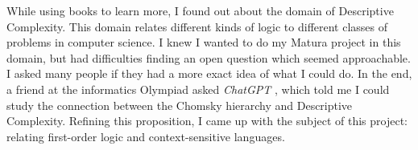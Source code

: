 While using books to learn more, I found out about the domain of Descriptive Complexity.
This domain relates different kinds of logic to different classes of problems in computer science.
I knew I wanted to do my Matura project in this domain, but had difficulties finding an open question which seemed approachable.
I asked many people if they had a more exact idea of what I could do.
In the end, a friend at the informatics Olympiad asked \emph{ChatGPT} \cite{chatgpt}, which told me I could study the connection between the Chomsky hierarchy and Descriptive Complexity.
Refining this proposition, I came up with the subject of this project: relating first-order logic and context-sensitive languages.